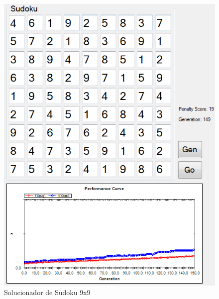 \documentclass[twoside]{article}
\begin{document}
\begin{multicols}{2}
\begin{figure}[H]
\label{fig:sudokusolver}
  \caption{Solucionador de Sudoku 9x9}
  \centering
    \includegraphics[scale = 0.55]{Sudoku9x9.png}
\end{figure}



\end{multicols}
\end{document}
